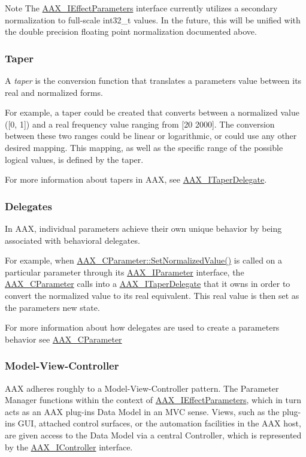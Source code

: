 \begin{DoxyNote}{Note}
The \mbox{\hyperlink{a01825}{A\+A\+X\+\_\+\+I\+Effect\+Parameters}} interface currently utilizes a secondary normalization to full-\/scale int32\+\_\+t values. In the future, this will be unified with the double precision floating point normalization documented above.
\end{DoxyNote}
\hypertarget{a00814_taper}{}\subsubsection{Taper}\label{a00814_taper}
A {\itshape taper} is the conversion function that translates a parameter\textquotesingle{}s value between its real and normalized forms.

For example, a taper could be created that converts between a normalized value (\mbox{[}0, 1\mbox{]}) and a real frequency value ranging from \mbox{[}20 2000\mbox{]}. The conversion between these two ranges could be linear or logarithmic, or could use any other desired mapping. This mapping, as well as the specific range of the possible logical values, is defined by the taper.

For more information about tapers in A\+AX, see \mbox{\hyperlink{a01881}{A\+A\+X\+\_\+\+I\+Taper\+Delegate}}.\hypertarget{a00814_delegates}{}\subsubsection{Delegates}\label{a00814_delegates}
In A\+AX, individual parameters achieve their own unique behavior by being associated with behavioral delegates.

For example, when \mbox{\hyperlink{a01537_ac4f8ae8c5ecb2cd04ebc3aa2523449f7}{A\+A\+X\+\_\+\+C\+Parameter\+::\+Set\+Normalized\+Value()}} is called on a particular parameter through its \mbox{\hyperlink{a01857}{A\+A\+X\+\_\+\+I\+Parameter}} interface, the \mbox{\hyperlink{a01537}{A\+A\+X\+\_\+\+C\+Parameter}} calls into a \mbox{\hyperlink{a01881}{A\+A\+X\+\_\+\+I\+Taper\+Delegate}} that it owns in order to convert the normalized value to its real equivalent. This real value is then set as the parameter\textquotesingle{}s new state.

For more information about how delegates are used to create a parameter\textquotesingle{}s behavior see \mbox{\hyperlink{a01537}{A\+A\+X\+\_\+\+C\+Parameter}}\hypertarget{a00814_model_view_controller}{}\subsubsection{Model-\/\+View-\/\+Controller}\label{a00814_model_view_controller}
A\+AX adheres roughly to a Model-\/\+View-\/\+Controller pattern. The Parameter Manager functions within the context of \mbox{\hyperlink{a01825}{A\+A\+X\+\_\+\+I\+Effect\+Parameters}}, which in turn acts as an A\+AX plug-\/in\textquotesingle{}s Data Model in an M\+VC sense. Views, such as the plug-\/in\textquotesingle{}s G\+UI, attached control surfaces, or the automation facilities in the A\+AX host, are given access to the Data Model via a central Controller, which is represented by the \mbox{\hyperlink{a01789}{A\+A\+X\+\_\+\+I\+Controller}} interface.

